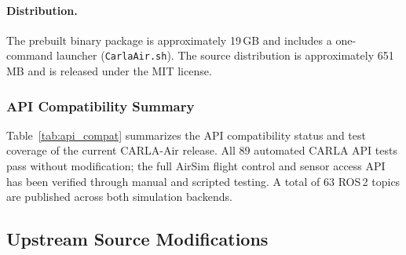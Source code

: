 \paragraph{Distribution.}
The prebuilt binary package is approximately 19\,GB and includes a one-command
launcher (\texttt{CarlaAir.sh}).
The source distribution is approximately 651\,MB and is released under the MIT
license.


\subsubsection{API Compatibility Summary}
\label{app:api}

Table~\ref{tab:api_compat} summarizes the API compatibility status and test
coverage of the current CARLA-Air release.
All 89 automated CARLA API tests pass without modification; the full AirSim
flight control and sensor access API has been verified through manual and
scripted testing.
A total of 63 ROS\,2 topics are published across both simulation backends.

\begin{table}[!htbp]
\centering
\caption{API compatibility and test coverage.}
\label{tab:api_compat}
\small
\setlength{\tabcolsep}{3pt}
\renewcommand{\arraystretch}{1.08}
%
\end{table}


\subsection{Upstream Source Modifications}
\label{app:source_mods}

